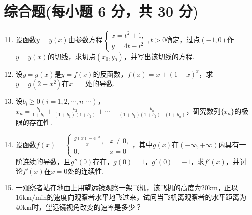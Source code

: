 \documentclass[../Main.tex]{subfiles}
\begin{document}
\section{综合题(每小题 6 分，共 30 分)}
\begin{enumerate}
    \setcounter{enumi}{10}
    \item 设函数$y=y(x)$由参数方程$\begin{cases}
                  x=t^{2}+1, \\
                  y=4t-t^{2}
              \end{cases},t>0$确定，过点$(-1,0)$作$y=y(x)$的切线，求切点$(x_{0},y_{0})$，并写出该切线的方程.
          \vspace{10em}

    \item 设$y=g(x)$是$y=f(x)$的反函数，$f(x)=x+(1+x)^{x}$，求$y=g(2+x^{2})$在$x
              =1$处的导数.
          \vspace{10em}

    \item 设$b_{i}\geq0(i=1,2,\cdots,n,\cdots)$，$x_{n}=\frac{b_{1}}{1+b_{1}}
              +\frac{b_{2}}{(1+b_{1})(1+b_{2})}+\cdots+\frac{b_{n}}{(1+b_{1})(1+b_{2})\cdots(1+b_{n})}$，研究数列$\{
              x_{n}\}$的极限的存在性.
          \vspace{8em}

    \item 设函数$f(x)=
              \begin{cases}
                  \frac{g(x)-\mathrm{e}^{-x}}{x}, & x\neq0, \\
                  0,                              & x=0
              \end{cases}$，其中$g(x)$在$(-\infty,+\infty)$内具有一阶连续的导数，且$g''(0
              )$存在，$g(0)=1$，$g'(0)=-1$，求$f'(x)$，并讨论$f'(x)$在$x=0$处的连续性.
          \vspace{8em}

    \item 一观察者站在地面上用望远镜观察一架飞机，该飞机的高度为$20\mathrm{km}$，正以$1
              6\mathrm{km/min}$的速度向观察者水平地飞过来，试问当飞机离观察者的水平距离为$4
              0\mathrm{km}$时，望远镜视角改变的速率是多少？
          \vspace{8em}
\end{enumerate}
\end{document}
